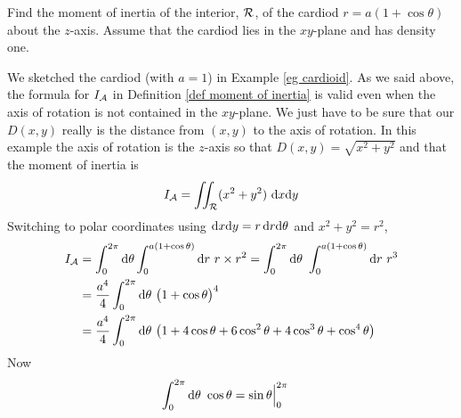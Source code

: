 \begin{eg}[Cardioid]\label{eg moment cardiod}
Find the moment of inertia of the interior, $\mathcal{R}$,
of the cardiod $r=a(1+\cos\theta)$ about the $z$-axis. 
Assume that the cardiod lies in the $xy$-plane and  has density one.

\soln We sketched the cardiod (with $a=1$) in Example \ref{eg cardioid}.
As we said above, the formula for $I_{\mathcal{A}}$ in Definition 
\ref{def moment of inertia} is valid even when the axis of 
rotation is not contained in the $xy$-plane. We just have to
be sure that our $D(x,y)$ really is the distance from $(x,y)$ to
the axis of rotation. In this example the axis of rotation is the
$z$-axis so that $D(x,y)=\sqrt{x^2+y^2}$ and that the moment of
inertia is 
\begin{equation*}
I_{\mathcal{A}} = \iint_{\mathcal{R}} (x^2+y^2)\ \mathrm{d}x\mathrm{d}y
\end{equation*}
Switching to polar coordinates using $\mathrm{d}x\mathrm{d}y=r\,\mathrm{d}r\mathrm{d}\theta$
and $x^2+y^2=r^2$,
\begin{align*}
I_\cA &= \int_0^{2\pi}\dee{\theta}\int_0^{a(1+\cos\theta)}\dee{r}\ r\times r^2
      = \int_0^{2\pi}\dee{\theta}\ \int_0^{a(1+\cos\theta)}\dee{r}\ r^3 \\
&=\frac{a^4}{4}\int_0^{2\pi}\dee{\theta}\
          \big(1+\cos\theta\big)^4  \\
&=\frac{a^4}{4}\int_0^{2\pi}\dee{\theta}\ 
          \big(1+4\cos\theta+6\cos^2\theta+4\cos^3\theta+\cos^4\theta\big) 
\end{align*}
Now
\begin{align*}
\int_0^{2\pi}\dee{\theta}\ \cos\theta
     &= \sin\theta\Big|_0^{2\pi}

\end{align*}
\end{eg}
